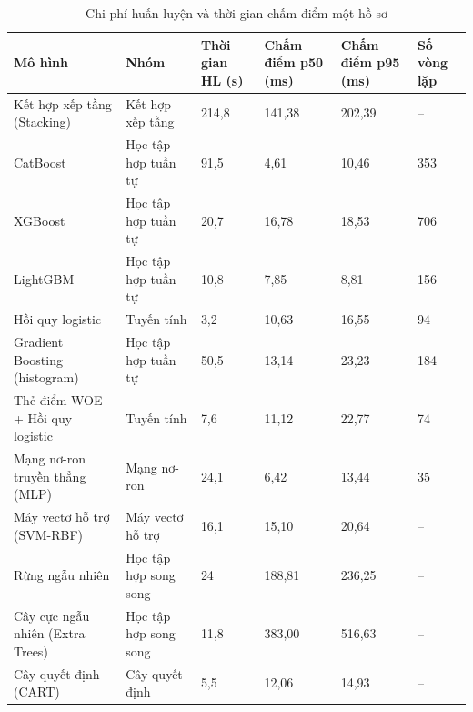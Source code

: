 \begin{table}[!htbp]
\centering
\caption{Chi phí huấn luyện và thời gian chấm điểm một hồ sơ}
\label{tab:model-cost}
\small
\setlength{\tabcolsep}{3.0pt}
\begin{tabular}{@{}L{3.799cm}L{2.849cm}R{1.899cm}R{1.994cm}R{1.994cm}R{1.709cm}@{}}
\toprule
\textbf{Mô hình} & \textbf{Nhóm} & \textbf{Thời gian HL (s)} & \textbf{Chấm điểm p50 (ms)} & \textbf{Chấm điểm p95 (ms)} & \textbf{Số vòng lặp} \\
\midrule
Kết hợp xếp tầng (Stacking) & Kết hợp xếp tầng & 214,8 & 141,38 & 202,39 & -- \\
CatBoost & Học tập hợp tuần tự & 91,5 & 4,61 & 10,46 & 353 \\
XGBoost & Học tập hợp tuần tự & 20,7 & 16,78 & 18,53 & 706 \\
LightGBM & Học tập hợp tuần tự & 10,8 & 7,85 & 8,81 & 156 \\
Hồi quy logistic & Tuyến tính & 3,2 & 10,63 & 16,55 & 94 \\
Gradient Boosting (histogram) & Học tập hợp tuần tự & 50,5 & 13,14 & 23,23 & 184 \\
Thẻ điểm WOE + Hồi quy logistic & Tuyến tính & 7,6 & 11,12 & 22,77 & 74 \\
Mạng nơ-ron truyền thẳng (MLP) & Mạng nơ-ron & 24,1 & 6,42 & 13,44 & 35 \\
Máy vectơ hỗ trợ (SVM-RBF) & Máy vectơ hỗ trợ & 16,1 & 15,10 & 20,64 & -- \\
Rừng ngẫu nhiên & Học tập hợp song song & 24 & 188,81 & 236,25 & -- \\
Cây cực ngẫu nhiên (Extra Trees) & Học tập hợp song song & 11,8 & 383,00 & 516,63 & -- \\
Cây quyết định (CART) & Cây quyết định & 5,5 & 12,06 & 14,93 & -- \\
\bottomrule
\end{tabular}
\end{table}
